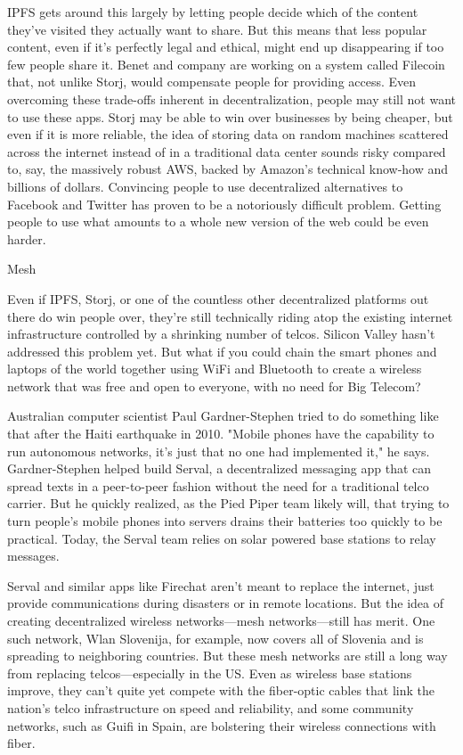 \documentclass{tnreport}
\begin{document}
IPFS gets around this largely by letting people decide which of the content they've visited they actually want to share. But this means that less popular content, even if it's perfectly legal and ethical, might end up disappearing if too few people share it. Benet and company are working on a system called Filecoin that, not unlike Storj, would compensate people for providing access.
Even overcoming these trade-offs inherent in decentralization, people may still not want to use these apps. Storj may be able to win over businesses by being cheaper, but even if it is more reliable, the idea of storing data on random machines scattered across the internet instead of in a traditional data center sounds risky compared to, say, the massively robust AWS, backed by Amazon's technical know-how and billions of dollars. Convincing people to use decentralized alternatives to Facebook and Twitter has proven to be a notoriously difficult problem. Getting people to use what amounts to a whole new version of the web could be even harder.

Mesh

Even if IPFS, Storj, or one of the countless other decentralized platforms out there do win people over, they're still technically riding atop the existing internet infrastructure controlled by a shrinking number of telcos. Silicon Valley hasn't addressed this problem yet. But what if you could chain the smart phones and laptops of the world together using WiFi and Bluetooth to create a wireless network that was free and open to everyone, with no need for Big Telecom?

Australian computer scientist Paul Gardner-Stephen tried to do something like that after the Haiti earthquake in 2010. "Mobile phones have the capability to run autonomous networks, it's just that no one had implemented it," he says. Gardner-Stephen helped build Serval, a decentralized messaging app that can spread texts in a peer-to-peer fashion without the need for a traditional telco carrier. But he quickly realized, as the Pied Piper team likely will, that trying to turn people's mobile phones into servers drains their batteries too quickly to be practical. Today, the Serval team relies on solar powered base stations to relay messages.

Serval and similar apps like Firechat aren't meant to replace the internet, just provide communications during disasters or in remote locations. But the idea of creating decentralized wireless networks—mesh networks—still has merit. One such network, Wlan Slovenija, for example, now covers all of Slovenia and is spreading to neighboring countries. But these mesh networks are still a long way from replacing telcos—especially in the US. Even as wireless base stations improve, they can't quite yet compete with the fiber-optic cables that link the nation's telco infrastructure on speed and reliability, and some community networks, such as Guifi in Spain, are bolstering their wireless connections with fiber.
\end{document}
